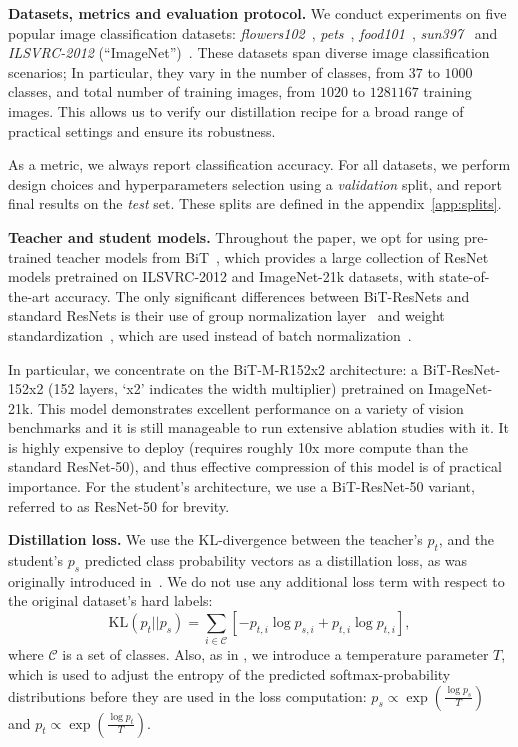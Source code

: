 \documentclass[10pt,twocolumn,letterpaper]{article}
\begin{document}
\label{datasets_introduction}
\textbf{Datasets, metrics and evaluation protocol.} We conduct experiments on five popular image classification datasets: \emph{flowers102}~\cite{dataflowers}, \emph{pets}~\cite{datapets},  \emph{food101}~\cite{datafood}, \emph{sun397}~\cite{datasun} and \emph{ILSVRC-2012} (``ImageNet'')~\cite{imagenet}. 
These datasets span diverse image classification scenarios; In particular, they vary in the number of classes, from $37$ to $1000$ classes, and total number of training images, from $1020$ to $1281167$ training images.
This allows us to verify our distillation recipe for a broad range of practical settings and ensure its robustness.

As a metric, we always report classification accuracy. For all datasets, we perform design choices and hyperparameters selection using a \emph{validation} split, and report final results on the \emph{test} set. These splits are defined in the appendix~\ref{app:splits}.   

\textbf{Teacher and student models.} Throughout the paper, we opt for using  pre-trained teacher models from BiT~\cite{brain2020bit}, which provides a large collection of ResNet models pretrained on ILSVRC-2012 and ImageNet-21k datasets, with state-of-the-art accuracy. The only significant differences  between BiT-ResNets and standard ResNets is their use of group normalization layer~\cite{wu2018group} and weight standardization~\cite{qiao2019micro}, which are used instead of batch normalization~\cite{ioffe2015batch}.

In particular, we concentrate on the BiT-M-R152x2 architecture: a BiT-ResNet-152x2 (152 layers, `x2' indicates the width multiplier) pretrained on ImageNet-21k.  This model demonstrates excellent performance on a variety of vision benchmarks and it is still manageable to run extensive ablation studies with it. 
It is highly expensive to deploy (requires roughly 10x more compute than the standard ResNet-50), and thus effective compression of this model is of practical importance. 
For the student's architecture, we use a BiT-ResNet-50 variant, referred to as ResNet-50 for brevity.

\textbf{Distillation loss.} We use the KL-divergence between the teacher's $p_t$, and the student's $p_s$ predicted class probability vectors as a distillation loss, as was originally introduced in~\cite{hinton}. We do not use any additional loss term with respect to the original dataset's hard labels: 
\begin{equation}
\mathrm{KL}(p_t || p_s) = \sum\limits_{i \in \mathcal{C}} \left[-p_{t,i} \log p_{s,i} + p_{t,i} \log p_{t,i} \right],
\end{equation}
where $\mathcal{C}$ is a set of classes. Also, as in \cite{hinton}, we introduce a temperature parameter $T$, which is used to adjust the entropy of the predicted softmax-probability distributions before they are used in the loss computation: $p_s \propto \exp(\frac{\log p_s}{T})$ and $p_t \propto \exp(\frac{\log p_t}{T})$.
\end{document}
